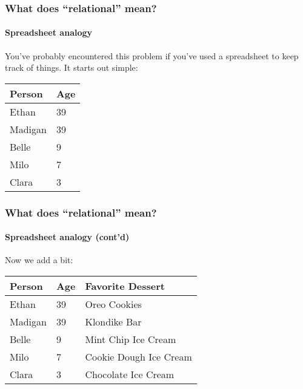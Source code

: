 \documentclass{beamer}
\begin{document}
\begin{frame}
  \frametitle{What does ``relational'' mean?}
  \framesubtitle{Spreadsheet analogy}

  You've probably encountered this problem if you've used a spreadsheet to
  keep track of things. It starts out simple:

  \begin{table}[]
    \begin{tabular}{@{}ll@{}}
      \toprule
      Person  & Age \\ \midrule
      Ethan   & 39  \\
      Madigan & 39  \\
      Belle   & 9   \\
      Milo    & 7   \\
      Clara   & 3   \\ \bottomrule
    \end{tabular}
  \end{table}
\end{frame}

\begin{frame}
  \frametitle{What does ``relational'' mean?}
  \framesubtitle{Spreadsheet analogy (cont'd)}

  Now we add a bit:

  \begin{table}[]
    \begin{tabular}{@{}lll@{}}
      \toprule
      Person  & Age & Favorite Dessert       \\ \midrule
      Ethan   & 39  & Oreo Cookies           \\
      Madigan & 39  & Klondike Bar           \\
      Belle   & 9   & Mint Chip Ice Cream    \\
      Milo    & 7   & Cookie Dough Ice Cream \\
      Clara   & 3   & Chocolate Ice Cream    \\ \bottomrule
    \end{tabular}
  \end{table}
\end{frame}
\end{document}

